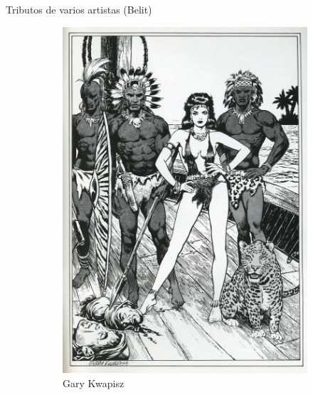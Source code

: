 \begin{frame}{Tributos de varios artistas (Belit)}
\begin{figure}[htp]
\begin{subfigure}[b]{0.22\textwidth}
			\includegraphics[width=\textwidth]{img/tributos/GaryKwapisz}
			\caption{Gary Kwapisz}
		\end{subfigure}
		~
		\begin{subfigure}[b]{0.22\textwidth}

\end{subfigure}
\end{figure}
\end{frame}
